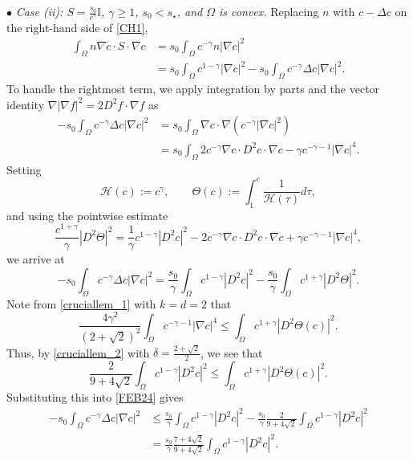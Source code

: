 \documentclass{amsart}
\numberwithin{equation}{section}
\newenvironment{pfthm3}{{\par\noindent\bf
           Proof of Theorem~\ref{THM3}. }}{\hfill\fbox{}\par\vspace{.2cm}}
\begin{document}
\begin{pfthm3}
$\bullet$ \emph{Case (ii): $S=\frac{s_{0}}{c^{\gamma}} \mathbb{I}$, $\gamma\ge1$, $s_{0}< s_{\star} $, and $\Omega$ is convex.}  
Replacing $n$ with $  c-\Delta c$ on the right-hand side of \eqref{CH1},
\begin{equation}\label{FEB23}
\begin{aligned}
\int_{\Omega} n\nabla \tilde{c}\cdot S \cdot \nabla  c &= s_0 \int_{\Omega}  c^{-\gamma} n |\nabla c|^2 \\&=  s_0 \int_{\Omega}  c^{1-\gamma} |\nabla c|^2 -s_0\int_{\Omega} c^{-\gamma} \Delta c   |\nabla c|^2 .
\end{aligned}
\end{equation}
To handle the rightmost term, we apply integration by parts and the vector identity $\nabla |\nabla f|^2 = 2 D^2 f \cdot \nabla f$ as
\[
\begin{aligned}
-s_{0} \int_{\Omega} c^{-\gamma} \Delta c |\nabla c|^2 &= s_{0} \int_{\Omega} \nabla c \cdot \nabla(c^{-\gamma} |\nabla c|^2) \\&= s_{0} \int_{\Omega}2   c^{-\gamma} \nabla c \cdot D^2 c \cdot \nabla c  -\gamma  c^{-\gamma-1} |\nabla c|^4. 
\end{aligned}
\]
Setting
\[
\mathcal{H}(c) := c^\gamma,\qquad  
\Theta(c):=\int_{1}^{c}\frac{1}{\mathcal{H}(\tau)}d\tau,
\]
and using the pointwise estimate   
\[
\frac{c^{1+\gamma}}{\gamma} |D^2 \Theta|^2 = \frac{1}{\gamma} c^{1-\gamma} |D^2 c|^2 - 2 c^{-\gamma} \nabla c \cdot D^2 c \cdot \nabla c  + \gamma c^{-\gamma-1} |\nabla c|^4,
\]
we arrive at
\begin{equation}\label{FEB24}
- s_{0} \int_{\Omega} c^{-\gamma} \Delta c |\nabla c|^2=    \frac{s_{0} }{\gamma} \int_{\Omega} c^{1-\gamma} |D^2 c|^2 -   \frac{s_{0} }{\gamma} \int_{\Omega}  c^{1+\gamma}  |D^2 \Theta|^2.
\end{equation}
Note from \eqref{cruciallem_1} with $k=d=2$  that
\[
 \frac{4 \gamma^{2} }{(2+\sqrt{2})^2}\int_{\Omega} c^{-\gamma-1} |\nabla c|^4 \le  \int_{\Omega} c^{1+\gamma} |D^2 \Theta(c)|^2.
\]
Thus, by  \eqref{cruciallem_2} with   $\delta = \frac{2+\sqrt{2}}{2}$, we see that
\[
\frac{2}{9+4\sqrt{2}}\int_{\Omega} c^{1-\gamma} |D^2 c|^2 \le  \int_{\Omega} c^{1+\gamma} |D^2 \Theta(c)|^2.
\]
Substituting this into \eqref{FEB24} gives
\[
\begin{aligned}
-s_0 \int_{\Omega} c^{-\gamma} \Delta c |\nabla c|^2 &\le \frac{s_{0}}{\gamma} \int_{\Omega} c^{1-\gamma} |D^2 c|^2 - \frac{s_{0}}{\gamma} \frac{2}{9+4\sqrt{2}} \int_{\Omega} c^{1-\gamma} |D^2 c|^2 \\
&= \frac{s_{0}}{\gamma} \frac{7+4\sqrt{2}}{9+4\sqrt{2}} \int_{\Omega} c^{1-\gamma} |D^2 c|^2.

\end{aligned}\]
\end{pfthm3}
\end{document}
